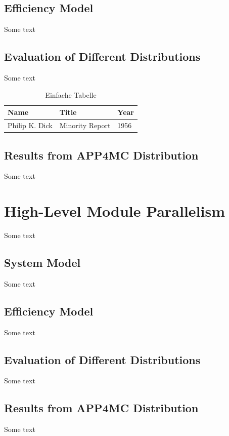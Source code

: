 \subsection{Efficiency Model}
Some text \\
\subsection{Evaluation of Different Distributions}
Some text \\

\begin{table}[h!]
	\begin{tabular}{|l|l|l|}
		\hline
		Name & Title & Year \\
		\hline
		\hline
		Philip K. Dick & Minority Report & 1956 \\
		\hline
	\end{tabular}
	\caption{Einfache Tabelle}
	\label{properties_coremonitoring}
\end{table}
\subsection{Results from APP4MC Distribution}
Some text \\
\section{High-Level Module Parallelism}
Some text \\
\subsection{System Model}
Some text \\
\subsection{Efficiency Model}
Some text \\
\subsection{Evaluation of Different Distributions}
Some text \\
\subsection{Results from APP4MC Distribution}
Some text \\
